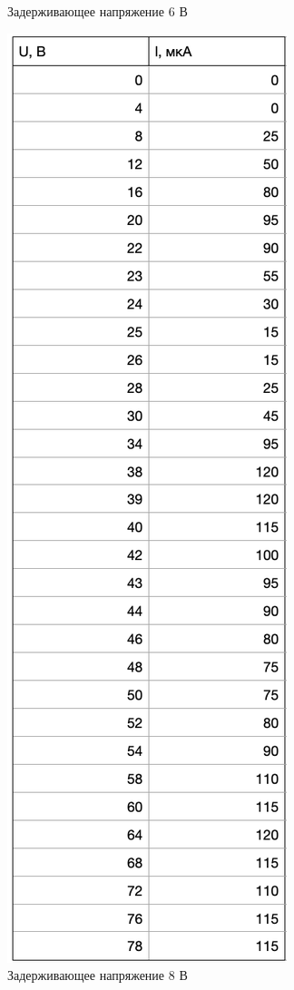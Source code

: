 \documentclass[a4paper]{article}
\begin{document}
\begin{enumerate}
\begin{figure}[H]
\begin{center}
\begin{minipage}[h]{0.3\linewidth}
	\caption{Задерживающее напряжение 6 В}
	\label{t2}
    \end{minipage}
    \hfill 
	\begin{minipage}[h]{0.3\linewidth}
	\includegraphics[width=1\linewidth]{t3.png}
	\caption{Задерживающее напряжение 8 В}
	\label{t3}
	\end{minipage}
	\end{center}
\end{figure}


\end{enumerate}
\end{document}
